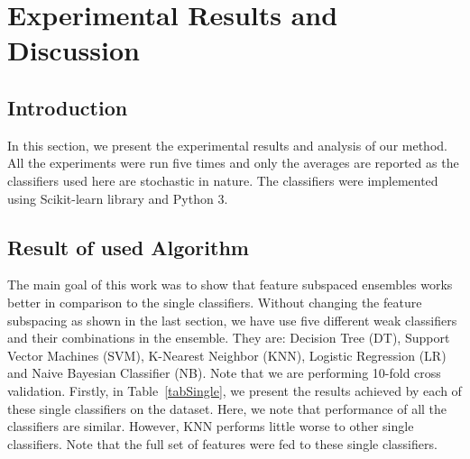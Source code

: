 \chapter{Experimental Results and Discussion} \label{Result}

\ifpdf
    \graphicspath{{chapter_5/figures/PNG/}{chapter_5/figures/PDF/}{chapter_5/figures/}}
\else
    \graphicspath{{chapter_5/figures/EPS/}{chapter_5/figures/}}
\fi

\section{Introduction}
In this section, we present the experimental results and analysis of our method. All the experiments were run five times and only the averages are reported as the classifiers used here are stochastic in nature. The classifiers were implemented using Scikit-learn library and Python 3.

\section{Result of used Algorithm}
The main goal of this work was to show that feature subspaced ensembles works better in comparison to the single classifiers. Without changing the feature subspacing as shown in the last section, we have use five different weak classifiers and their combinations in the ensemble. They are: Decision Tree (DT), Support Vector Machines (SVM), K-Nearest Neighbor (KNN), Logistic Regression (LR) and Naive Bayesian Classifier (NB). Note that we are performing 10-fold cross validation. Firstly, in Table~\ref{tabSingle}, we present the results achieved by each of these single classifiers on the dataset. Here, we note that performance of all the classifiers are similar. However, KNN performs little worse to other single classifiers. Note that the full set of features were fed to these single classifiers.




